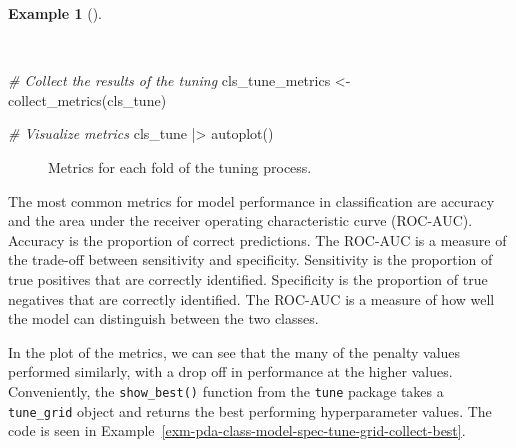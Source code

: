 \documentclass[
  letterpaper,
  DIV=11,
  numbers=noendperiod]{scrreprt}
\newenvironment{Shaded}{\begin{snugshade}}{\end{snugshade}}
\newcommand{\CommentTok}[1]{\textcolor[rgb]{0.00,0.00,0.00}{\textit{#1}}}
\newcommand{\FunctionTok}[1]{\textcolor[rgb]{0.00,0.00,0.00}{#1}}
\newcommand{\NormalTok}[1]{\textcolor[rgb]{0.00,0.00,0.00}{#1}}
\newcommand{\OtherTok}[1]{\textcolor[rgb]{0.00,0.00,0.00}{#1}}
\newcommand{\SpecialCharTok}[1]{\textcolor[rgb]{0.00,0.00,0.00}{#1}}
\theoremstyle{definition}
\newtheorem{example}{Example}[chapter]
\theoremstyle{remark}
\begin{document}
\begin{example}[]\protect\hypertarget{exm-pda-class-model-spec-tune-grid-collect}{}\label{exm-pda-class-model-spec-tune-grid-collect}

~

\begin{Shaded}
\begin{Highlighting}[]
\CommentTok{\# Collect the results of the tuning}
\NormalTok{cls\_tune\_metrics }\OtherTok{\textless{}{-}}
  \FunctionTok{collect\_metrics}\NormalTok{(cls\_tune)}

\CommentTok{\# Visualize metrics}
\NormalTok{cls\_tune }\SpecialCharTok{|\textgreater{}} \FunctionTok{autoplot}\NormalTok{()}
\end{Highlighting}
\end{Shaded}

\begin{figure}[H]


\caption{\label{fig-pda-class-model-spec-tune-grid-collect}Metrics for
each fold of the tuning process.}

\end{figure}%

\end{example}

The most common metrics for model performance in classification are
accuracy and the area under the receiver operating characteristic curve
(ROC-AUC). Accuracy is the proportion of correct predictions. The
ROC-AUC is a measure of the trade-off between sensitivity and
specificity. Sensitivity is the proportion of true positives that are
correctly identified. Specificity is the proportion of true negatives
that are correctly identified. The ROC-AUC is a measure of how well the
model can distinguish between the two classes.

In the plot of the metrics, we can see that the many of the penalty
values performed similarly, with a drop off in performance at the higher
values. Conveniently, the \texttt{show\_best()} function from the
\texttt{tune} package takes a \texttt{tune\_grid} object and returns the
best performing hyperparameter values. The code is seen in
Example~\ref{exm-pda-class-model-spec-tune-grid-collect-best}.
\end{document}
